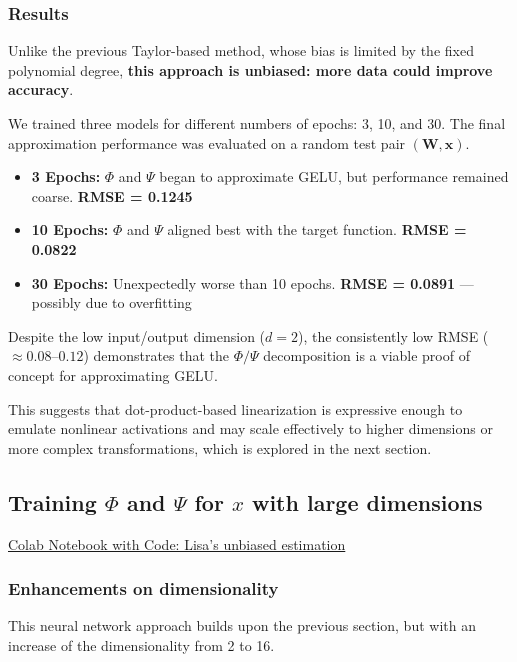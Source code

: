 \documentclass{article}
\begin{document}
\subsubsection{Results}

Unlike the previous Taylor-based method, whose bias is limited by the fixed polynomial degree, \textbf{this approach is unbiased: more data could improve accuracy}.

We trained three models for different numbers of epochs: 3, 10, and 30. The final approximation performance was evaluated on a random test pair $(\mathbf{W}, \mathbf{x})$.

\begin{itemize}
    \item \textbf{3 Epochs:} $\Phi$ and $\Psi$ began to approximate GELU, but performance remained coarse.  
    \textbf{RMSE = 0.1245}
    \item \textbf{10 Epochs:} $\Phi$ and $\Psi$ aligned best with the target function.  
    \textbf{RMSE = 0.0822}
    \item \textbf{30 Epochs:} Unexpectedly worse than 10 epochs.  
    \textbf{RMSE = 0.0891} — possibly due to overfitting
\end{itemize}


Despite the low input/output dimension ($d = 2$), the consistently low RMSE ($\approx 0.08$–$0.12$) demonstrates that the $\Phi/\Psi$ decomposition is a viable proof of concept for approximating GELU. 

This suggests that dot-product-based linearization is expressive enough to emulate nonlinear activations and may scale effectively to higher dimensions or more complex transformations, which is explored in the next section.

\subsection{Training $\Phi$ and $\Psi$ for $x$ with large dimensions} 

\href{https://github.com/lisahqwang/ML-DL-CV/blob/main/Lisa_Unbiased_Estimation.ipynb}{
Colab Notebook with Code: Lisa's unbiased estimation}

\subsubsection{Enhancements on dimensionality}
This neural network approach builds upon the previous section, but with an increase of the dimensionality from 2 to 16.
\end{document}
